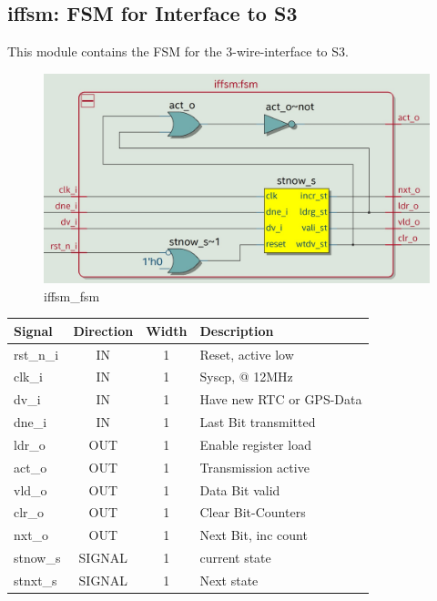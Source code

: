 \documentclass[12pt,a4 paper] {report}
\begin{document}
\subsection{iffsm: FSM for Interface to S3}
This module contains the FSM for the 3-wire-interface to S3.
\begin{figure}[h]
	\centering	
	\includegraphics[scale=0.2]{../png/iffsm_fsm.png}
	\caption{iffsm\_fsm}
\end{figure}
\begin{center}
	\begin{tabular}{ | p{2cm} | c | c | p{5cm} |}
		\hline
		\textbf{Signal} & \textbf{Direction} & \textbf{Width} & \textbf{Description} \\
		\hline
		\hline
		rst\_n\_i & IN & 1 & Reset, active low \\
		\hline
		clk\_i & IN & 1 & Syscp, @ 12MHz \\
		\hline
		dv\_i & IN & 1 & Have new RTC or GPS-Data \\
		\hline
		dne\_i & IN & 1 & Last Bit transmitted \\
		\hline
		ldr\_o & OUT & 1 & Enable register load \\
		\hline
		act\_o & OUT & 1 & Transmission active \\
		\hline
		vld\_o & OUT & 1 & Data Bit valid \\
		\hline
		clr\_o & OUT & 1 & Clear Bit-Counters \\
		\hline
		nxt\_o & OUT & 1 & Next Bit, inc count \\
		\hline
		\hline
		stnow\_s & SIGNAL & 1 & current state\\
		\hline	
		stnxt\_s & SIGNAL & 1 & Next state\\
		\hline
	\end{tabular}
\end{center}
\end{document}
